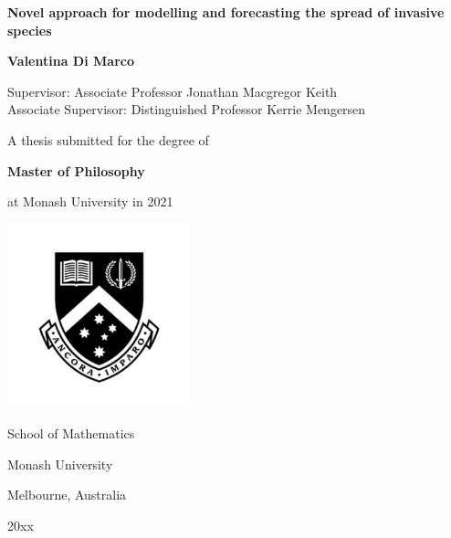 \begin{titlepage}
  \begin{center}
    \vspace*{\fill}

\begin{center}
    { %
      \textbf{
        \Large Novel approach for modelling and forecasting the spread of invasive species
              } 
    }
\end{center}
    
    \vspace{2cm}
    
    {
      \Large
      \textbf{Valentina Di Marco}
    }

    \vspace{0.3cm}
    
    {
      \normalsize
      Supervisor: Associate Professor Jonathan Macgregor Keith \\
      Associate Supervisor: Distinguished Professor Kerrie Mengersen
      
    }
    
    \vspace{3cm}

    {
      \large
      A thesis submitted for the degree of

      \vspace{0.25cm}
      
      \textbf{Master of Philosophy}

      \vspace{0.25cm}
      
      at Monash University in 2021
    }
    
    \vspace{2.5cm}

    {
      \includegraphics[width=0.4\textwidth]{monash-logo}
    }

    {
      School of Mathematics
      
      Monash University
      
      Melbourne, Australia
      
      20xx
    }
    
    \vspace*{\fill}
  \end{center}
\end{titlepage}

\clearpage
